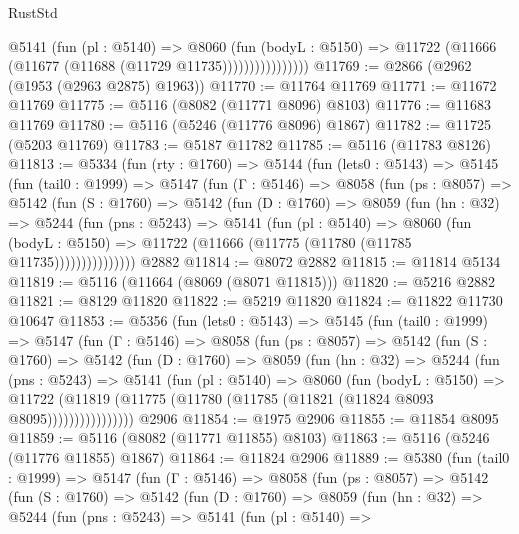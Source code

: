 \begin{lexlean}{RustStd}
\begin{coremodule}
                      @5141
                        (fun (pl : @5140) =>
                        @8060
                          (fun (bodyL : @5150) =>
                          @11722 (@11666 (@11677 (@11688 (@11729 @11735))))))))))))))))
@11769 := @2866 (@2962 (@1953 (@2963 @2875) @1963))
@11770 := @11764 @11769
@11771 := @11672 @11769
@11775 := @5116 (@8082 (@11771 @8096) @8103)
@11776 := @11683 @11769
@11780 := @5116 (@5246 (@11776 @8096) @1867)
@11782 := @11725 (@5203 @11769)
@11783 := @5187 @11782
@11785 := @5116 (@11783 @8126)
@11813 := @5334
    (fun (rty : @1760) =>
    @5144
      (fun (lets0 : @5143) =>
      @5145
        (fun (tail0 : @1999) =>
        @5147
          (fun (Γ : @5146) =>
          @8058
            (fun (ps : @8057) =>
            @5142
              (fun (S : @1760) =>
              @5142
                (fun (D : @1760) =>
                @8059
                  (fun (hn : @32) =>
                  @5244
                    (fun (pns : @5243) =>
                    @5141
                      (fun (pl : @5140) =>
                      @8060
                        (fun (bodyL : @5150) =>
                        @11722 (@11666 (@11775 (@11780 (@11785 @11735)))))))))))))))
    @2882
@11814 := @8072 @2882
@11815 := @11814 @5134
@11819 := @5116 (@11664 (@8069 (@8071 @11815)))
@11820 := @5216 @2882
@11821 := @8129 @11820
@11822 := @5219 @11820
@11824 := @11822 @11730 @10647
@11853 := @5356
    (fun (lets0 : @5143) =>
    @5145
      (fun (tail0 : @1999) =>
      @5147
        (fun (Γ : @5146) =>
        @8058
          (fun (ps : @8057) =>
          @5142
            (fun (S : @1760) =>
            @5142
              (fun (D : @1760) =>
              @8059
                (fun (hn : @32) =>
                @5244
                  (fun (pns : @5243) =>
                  @5141
                    (fun (pl : @5140) =>
                    @8060
                      (fun (bodyL : @5150) =>
                      @11722
                        (@11819 (@11775 (@11780 (@11785 (@11821 (@11824 @8093 @8095))))))))))))))))
    @2906
@11854 := @1975 @2906
@11855 := @11854 @8095
@11859 := @5116 (@8082 (@11771 @11855) @8103)
@11863 := @5116 (@5246 (@11776 @11855) @1867)
@11864 := @11824 @2906
@11889 := @5380
    (fun (tail0 : @1999) =>
    @5147
      (fun (Γ : @5146) =>
      @8058
        (fun (ps : @8057) =>
        @5142
          (fun (S : @1760) =>
          @5142
            (fun (D : @1760) =>
            @8059
              (fun (hn : @32) =>
              @5244
                (fun (pns : @5243) =>
                @5141
                  (fun (pl : @5140) =>

\end{coremodule}
\end{lexlean}

